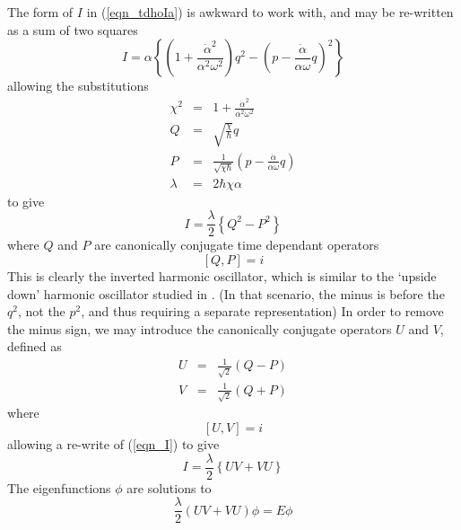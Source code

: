 \documentclass[11pt, a4paper, titlepage]{article}
\begin{document}
The form of $I$ in (\ref{eqn_tdhoIa}) is awkward to work with, and may
be re-written as a sum of two squares
\begin{equation}
  \label{eqn_tdhoIa2}
  I = \alpha
  \left\{
    \left(
      1 + \frac{\dot{\alpha}^2}{\alpha^2 \omega^2}
    \right) q^2 -
    \left(
      p - \frac{\dot{\alpha}}{\alpha \omega} q
    \right)^2
  \right\}
\end{equation}
allowing the substitutions
\begin{eqnarray}
  \label{eqn_chi}
   \chi^2 &=& 1 + \frac{\dot{\alpha}^2}{\alpha^2 \omega^2} \\
  \label{eqn_Q}
    Q &=& \sqrt{\frac{\chi}{\hbar}} q \\
  \label{eqn_P}
    P &=& \frac{1}{\sqrt{\chi \hbar}} \left( p - \frac{\dot{\alpha}}{\alpha \omega} q \right) \\
  \label{eqn_lambda}
    \lambda &=& 2\hbar\chi\alpha
\end{eqnarray}
to give
\begin{equation}
  \label{eqn_I}
  I = \frac{\lambda}{2} \left\{ Q^2 - P^2 \right\}
\end{equation}
where $Q$ and $P$ are canonically conjugate time dependant operators
\begin{equation}
  \label{eqn_QPcc}
   [Q, P] = i
\end{equation}
This is clearly the inverted harmonic oscillator, which is similar to
the `upside down' harmonic oscillator studied in \cite{ref_udho}. (In
that scenario, the minus is before the $q^2$, not the $p^2$, and thus
requiring a separate representation) In order to remove the minus
sign, we may introduce the canonically conjugate operators $U$ and
$V$, defined as
 \begin{eqnarray}
  \label{eqn_U}
    U &=& \frac {1}{\sqrt{2}} \left( Q - P \right) \\
  \label{eqn_V}
    V &=& \frac {1}{\sqrt{2}} \left( Q + P \right)
\end{eqnarray}
where
\begin{equation}
  \label{eqn_uvcc}
   [U, V] = i
\end{equation}
allowing a re-write of (\ref{eqn_I}) to give
\begin{equation}
  \label{eqn_Kuv}
   I = \frac{\lambda}{2} \left\{U V + V U \right\}
\end{equation}
The eigenfunctions $\phi$ are solutions to
\begin{equation}
   \label{eqn_schrodinger}
    \frac{\lambda}{2}(UV + VU)\phi = E \phi
\end{equation}
\end{document}
